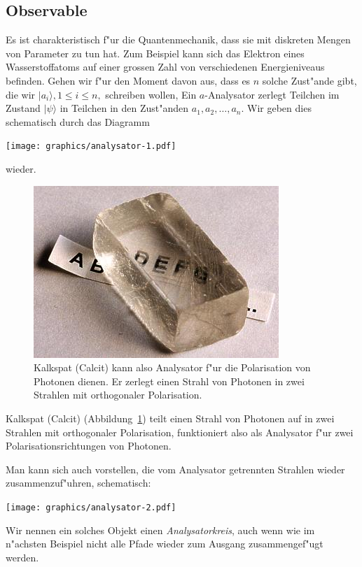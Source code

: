 \subsection{Observable}
Es ist charakteristisch f"ur die Quantenmechanik, dass sie mit diskreten
Mengen von Parameter zu tun hat. Zum Beispiel kann sich das Elektron eines
Wasserstoffatoms auf einer grossen Zahl von verschiedenen Energieniveaus
befinden. Gehen wir f"ur den Moment davon aus, dass es $n$ solche Zust"ande
gibt, die wir $|a_i\rangle, 1\le i\le n,$ schreiben wollen,
Ein $a$-Analysator zerlegt Teilchen im Zustand $|\psi\rangle$ in 
Teilchen in den Zust"anden $a_1,a_2,\dots,a_n$. Wir geben dies
schematisch durch das Diagramm
\begin{center}
\texttt{[image: graphics/analysator-1.pdf]}
\end{center}
wieder.
\begin{figure}
\centering
\includegraphics{images/calcit.jpg}
\caption{Kalkspat (Calcit) kann also Analysator f"ur die Polarisation
von Photonen dienen. Er zerlegt einen Strahl von Photonen in zwei
Strahlen mit orthogonaler Polarisation.
\label{skript:calcit}}
\end{figure}
Kalkspat (Calcit) (Abbildung~\ref{skript:calcit}) teilt einen Strahl
von Photonen auf in zwei Strahlen mit orthogonaler Polarisation,
funktioniert also als Analysator f"ur zwei Polarisationsrichtungen
von Photonen.

Man kann sich auch vorstellen, die vom Analysator getrennten Strahlen
wieder zusammenzuf"uhren, schematisch:
\begin{center}
\texttt{[image: graphics/analysator-2.pdf]}
\end{center}
Wir nennen ein solches Objekt einen {\em Analysatorkreis}, auch wenn wie
im n"achsten Beispiel nicht alle Pfade wieder zum Ausgang zusammengef"ugt
werden.

